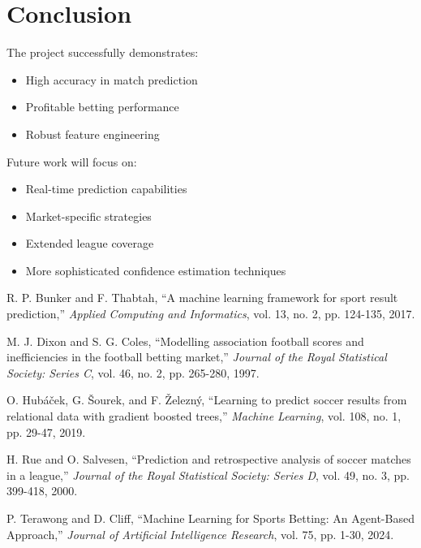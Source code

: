 \documentclass[conference]{IEEEtran}
\begin{document}
\section{Conclusion}
The project successfully demonstrates:
\begin{itemize}
    \item High accuracy in match prediction
    \item Profitable betting performance
    \item Robust feature engineering
\end{itemize}

Future work will focus on:
\begin{itemize}
    \item Real-time prediction capabilities
    \item Market-specific strategies
    \item Extended league coverage
    \item More sophisticated confidence estimation techniques
\end{itemize}

\begin{thebibliography}{5}
     R. P. Bunker and F. Thabtah, ``A machine learning framework for sport result prediction,'' \textit{Applied Computing and Informatics}, vol. 13, no. 2, pp. 124-135, 2017.
    
     M. J. Dixon and S. G. Coles, ``Modelling association football scores and inefficiencies in the football betting market,'' \textit{Journal of the Royal Statistical Society: Series C}, vol. 46, no. 2, pp. 265-280, 1997.
    
     O. Hubáček, G. Šourek, and F. Železný, ``Learning to predict soccer results from relational data with gradient boosted trees,'' \textit{Machine Learning}, vol. 108, no. 1, pp. 29-47, 2019.
    
     H. Rue and O. Salvesen, ``Prediction and retrospective analysis of soccer matches in a league,'' \textit{Journal of the Royal Statistical Society: Series D}, vol. 49, no. 3, pp. 399-418, 2000.
    
     P. Terawong and D. Cliff, ``Machine Learning for Sports Betting: An Agent-Based Approach,'' \textit{Journal of Artificial Intelligence Research}, vol. 75, pp. 1-30, 2024.
\end{thebibliography}
\end{document}
